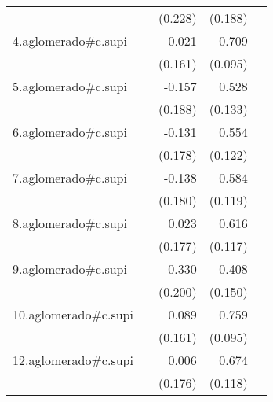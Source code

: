 {\begin{longtable}{l*{4}{D{.}{.}{-1}}}
            &                     &     (0.228)         &     (0.188)         &                     \\
\addlinespace
4.aglomerado#c.supi&                     &       0.021         &       0.709\sym{***}&                     \\
            &                     &     (0.161)         &     (0.095)         &                     \\
\addlinespace
5.aglomerado#c.supi&                     &      -0.157         &       0.528\sym{***}&                     \\
            &                     &     (0.188)         &     (0.133)         &                     \\
\addlinespace
6.aglomerado#c.supi&                     &      -0.131         &       0.554\sym{***}&                     \\
            &                     &     (0.178)         &     (0.122)         &                     \\
\addlinespace
7.aglomerado#c.supi&                     &      -0.138         &       0.584\sym{***}&                     \\
            &                     &     (0.180)         &     (0.119)         &                     \\
\addlinespace
8.aglomerado#c.supi&                     &       0.023         &       0.616\sym{***}&                     \\
            &                     &     (0.177)         &     (0.117)         &                     \\
\addlinespace
9.aglomerado#c.supi&                     &      -0.330         &       0.408\sym{**} &                     \\
            &                     &     (0.200)         &     (0.150)         &                     \\
\addlinespace
10.aglomerado#c.supi&                     &       0.089         &       0.759\sym{***}&                     \\
            &                     &     (0.161)         &     (0.095)         &                     \\
\addlinespace
12.aglomerado#c.supi&                     &       0.006         &       0.674\sym{***}&                     \\
            &                     &     (0.176)         &     (0.118)         &                     \\

\end{longtable}}
